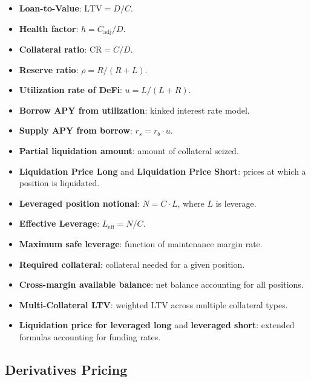 \documentclass[twoside,11pt]{article}
\begin{document}
\begin{itemize}
  \item \textbf{Loan-to-Value}: $\mathrm{LTV} = D/C$.
  \item \textbf{Health factor}: $h = C_{\mathrm{adj}} / D$.
  \item \textbf{Collateral ratio}: $\mathrm{CR} = C/D$.
  \item \textbf{Reserve ratio}: $\rho = R / (R + L)$.
  \item \textbf{Utilization rate of DeFi}: $u = L / (L + R)$.
  \item \textbf{Borrow APY from utilization}: kinked interest rate model.
  \item \textbf{Supply APY from borrow}: $r_s = r_b \cdot u$.
  \item \textbf{Partial liquidation amount}: amount of collateral seized.
  \item \textbf{Liquidation Price Long} and \textbf{Liquidation Price Short}:
    prices at which a position is liquidated.
  \item \textbf{Leveraged position notional}: $N = C \cdot L$, where $L$ is leverage.
  \item \textbf{Effective Leverage}: $L_{\mathrm{eff}} = N/C$.
  \item \textbf{Maximum safe leverage}: function of maintenance margin rate.
  \item \textbf{Required collateral}: collateral needed for a given position.
  \item \textbf{Cross-margin available balance}: net balance accounting for all positions.
  \item \textbf{Multi-Collateral LTV}: weighted LTV across multiple collateral types.
  \item \textbf{Liquidation price for leveraged long} and \textbf{leveraged short}:
    extended formulas accounting for funding rates.
\end{itemize}

\subsection{Derivatives Pricing}
\end{document}

